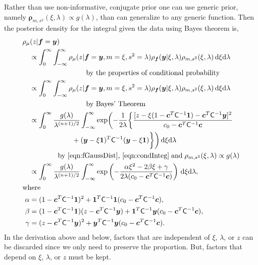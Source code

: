 \documentclass{iitthesis}          %
\newcommand{\bm}[1]{\boldsymbol{#1}}
\newcommand{\D}[1]{\text{d}{#1}}
\newcommand{\vc}{\bm{c}}
\newcommand{\vf}{\bm{f}}
\newcommand{\vrho}{\bm{\rho}}
\newcommand{\vy}{\bm{y}}
\newcommand{\vone}{\bm{1}}
\newcommand{\mC}{\mathsf{C}}
\begin{document}
Rather than use non-informative, conjugate prior one can use generic prior, namely $\vrho_{m,s^2}(\xi, \lambda) \propto g(\lambda)$, than can generalize to any generic function.
Then the posterior density for the integral given the data using Bayes theorem is,
\begin{align*}
\MoveEqLeft[1]{\rho_{\mu}(z | \vf = \vy)} \\
& \propto \int_{0}^\infty \int_{-\infty}^\infty \rho_{\mu}(z | \vf = \vy, m = \xi, s^2 = \lambda)  \rho_{\vf}(\vy | \xi, \lambda ) \rho_{m, s^2}(\xi, \lambda) \, \D \xi \D \lambda \\
&\qquad \qquad \qquad \qquad \text{by the properties of conditional probability} 
\\
& \propto \int_{0}^\infty \int_{-\infty}^\infty \rho_{\mu}(z | \vf = \vy, m = \xi, s^2 = \lambda)  \rho_{\vf}(\vy | \xi, \lambda ) \rho_{m, s^2}(\xi, \lambda) \, \D \xi \D \lambda \\
&\qquad \qquad \qquad \qquad \text{by Bayes' Theorem} 
\\
& \propto \displaystyle \int_{0}^\infty  \frac{g(\lambda)}{\lambda^{(n+1)/2}} 
\int_{-\infty}^\infty  \exp \biggl( -\frac{1}{2\lambda}\biggl\{
\frac{
	[z - \xi (1 - \vc^T \mC^{-1} \vone)  -  \vc^T \mC^{-1} \vy]^2}
{c_0  -\vc ^T \mC^{-1} \vc}  \\
& \qquad \qquad \qquad  + (\vy - \xi \vone)^T \mC^{-1}(\vy - \xi \vone) \biggr \} \biggr) \, \D \xi \D \lambda \\
&\qquad \qquad
\text{by \eqref{eqn:fGaussDist}, \eqref{eqn:condInteg}} \; \text{and} \; \rho_{m,s^2}(\xi,\lambda) \propto g(\lambda) \\
& \propto \displaystyle \int_{0}^\infty  \frac{g(\lambda)}{\lambda^{(n+1)/2}} \int_{-\infty}^\infty  \exp\left( -\frac{\alpha \xi^2 -2 \beta \xi + \gamma}{2\lambda(c_0  -\vc ^T \mC^{-1} \vc)} \right) \, \D \xi \D \lambda, \\
\intertext{where}
\alpha & = (1 - \vc^T \mC^{-1} \vone)^2 + \vone^T \mC^{-1} \vone (c_0  -\vc ^T \mC^{-1} \vc),\\
\beta & =(1 - \vc^T \mC^{-1} \vone)(z - \vc^T \mC^{-1} \vy )
+ \vone^T \mC^{-1} \vy (c_0  -\vc ^T \mC^{-1} \vc),\\
\gamma &  = (z - \vc^T \mC^{-1} \vy )^2  + \vy^T \mC^{-1} \vy (c_0  -\vc ^T \mC^{-1} \vc).
\end{align*}
In the derivation above and below, factors that are independent of $\xi$, $\lambda$, or $z$ can be discarded since we only need to preserve the proportion.  But, factors that depend on $\xi$, $\lambda$, or $z$ must be kept.  
\end{document}
